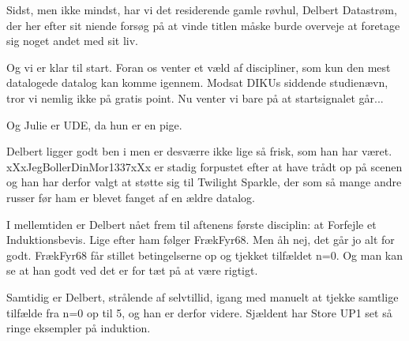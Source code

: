 \documentclass[a4paper,11pt]{article}
\begin{document}
\begin{sketch}

 Sidst, men ikke mindst, har vi det residerende gamle røvhul, Delbert Datastrøm, der her efter sit niende forsøg på at vinde titlen måske burde overveje at foretage sig noget andet med sit liv.


 Og vi er klar til start. Foran os venter et væld af discipliner, som kun den mest datalogede datalog kan komme igennem. Modsat DIKUs siddende studienævn, tror vi nemlig ikke på gratis point. Nu venter vi bare på at startsignalet går...


 Og Julie er UDE, da hun er en pige.  


 Delbert ligger godt ben i men er desværre ikke lige så frisk, som han har været. xXxJegBollerDinMor1337xXx er stadig forpustet efter at have trådt op på scenen og han har derfor valgt at støtte sig til Twilight Sparkle, der som så mange andre russer før ham er blevet fanget af en ældre datalog.


 I mellemtiden er Delbert nået frem til aftenens første disciplin: at Forfejle et Induktionsbevis. Lige efter ham følger FrækFyr68. Men åh nej, det går jo alt for godt. FrækFyr68 får stillet betingelserne op og tjekket tilfældet n=0. Og man kan se at han godt ved det er for tæt på at være rigtigt.


 Samtidig er Delbert, strålende af selvtillid, igang med manuelt at tjekke samtlige tilfælde fra n=0 op til 5, og han er derfor videre. Sjældent har Store UP1 set så ringe eksempler på induktion.




\end{sketch}
\end{document}
